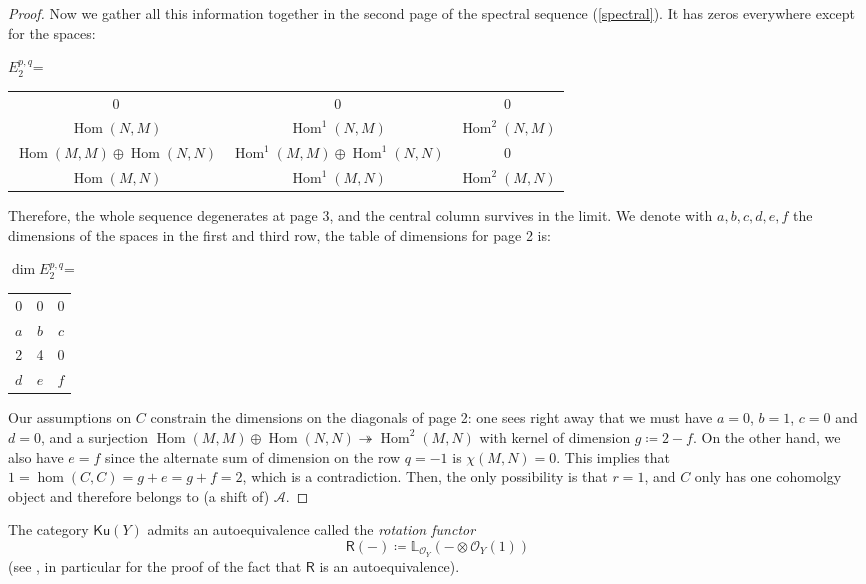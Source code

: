 \documentclass[11pt]{amsart}
\theoremstyle{definition}
\DeclareMathOperator{\Hom}{Hom}
\newcommand{\sA}{\mathcal{A}}
\newcommand{\sO}{\mathcal{O}}
\newcommand{\Ku}{\mathsf{Ku}}
\begin{document}
\begin{proof}
Now we gather all this information together in the second page of the spectral sequence (\ref{spectral}). It has zeros everywhere except for the spaces:
\begin{center}
$E_2^{p,q}$\quad = \quad\begin{tabular}{|ccc}
0 & 0 & 0 \\
 $\Hom(N,M)$ & $\Hom^1(N,M)$ & $\Hom^2(N,M)$\\
$\Hom(M,M)\oplus \Hom(N,N)$ & $\Hom^1(M,M)\oplus \Hom^1(N,N)$ &0\\
\hline
 $\Hom(M,N)$ & $\Hom^1(M,N)$ & $\Hom^2(M,N)$\\
\end{tabular} 
\end{center}
Therefore, the whole sequence degenerates at page 3, and the central column survives in the limit. We denote with $a,b,c,d,e,f$ the dimensions of the spaces in the first and third row, the table of dimensions for page 2 is:
\begin{center}
$\dim E_2^{p,q}$\quad = \quad \begin{tabular}{|ccc}
0 & 0 & 0 \\
 $a$ & $b$ & $c$\\
 2 & 4 &0\\
\hline
 $d$ & $e$ & $f$\\
\end{tabular}
\end{center}
Our assumptions on $C$ constrain the dimensions on the diagonals of page 2: one sees right away that we must have $a=0$, $b=1$, $c=0$ and $d=0$, and a surjection $\Hom(M,M)\oplus \Hom(N,N) \twoheadrightarrow \Hom^2(M,N)$ with kernel of dimension $g \coloneqq 2-f$. On the other hand, we also have $e=f$ since the alternate sum of dimension on the row $q=-1$ is $\chi(M,N)=0$. This implies that $1=\hom(C,C)=g+e=g+f=2$, which is a contradiction. Then, the only possibility is that $r=1$, and $C$ only has one cohomolgy object and therefore belongs to (a shift of) $\sA$.
\end{proof}

The category $\Ku(Y)$ admits an autoequivalence called the \textit{rotation functor} $$\mathsf R(-)\coloneqq \mathbb L_{\sO_Y} ( - \otimes \sO_Y(1))$$
(see \cite[Section~3.3]{Kuz15_fractional}, in particular \cite[Corollary~3.18]{Kuz15_fractional} for the proof of the fact that $\mathsf R$ is an autoequivalence). 

\end{document}
